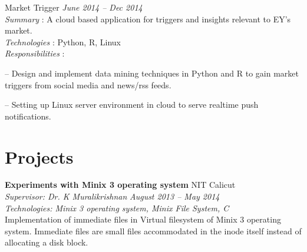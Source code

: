\documentclass[margin,line]{resume}
\begin{document}
\begin{resume}
    Market Trigger				 \hfill \textit{June 2014 -- Dec 2014} \\
\textit{Summary} : A cloud based application for triggers and insights relevant to EY's market.	 \\
      \textit{Technologies} : Python, R, Linux\\
      \textit{Responsibilities} : 
     	 	\begin{list2}
\item[--] Design and implement data mining techniques in Python and R to gain market triggers from
social media and news/rss feeds.	
	\item[--] Setting up Linux server environment in cloud to serve realtime push notifications.
	\end{list2}

	 
 \vspace{3mm}


    \section{\mysidestyle Projects}

   
	
	
    \textbf{Experiments with Minix 3 operating system } 				\hfill NIT Calicut \\
      \textit{Supervisor: Dr. K Muralikrishnan } 			\hfill \textit{August 2013 -- May 2014}\\
      \textit{Technologies: Minix 3 operating system, Minix File System, C }\\
    Implementation of immediate files in Virtual filesystem of Minix 3 operating system. Immediate files are small files accommodated in the inode itself instead of allocating a disk block. 


\end{resume}
\end{document}
